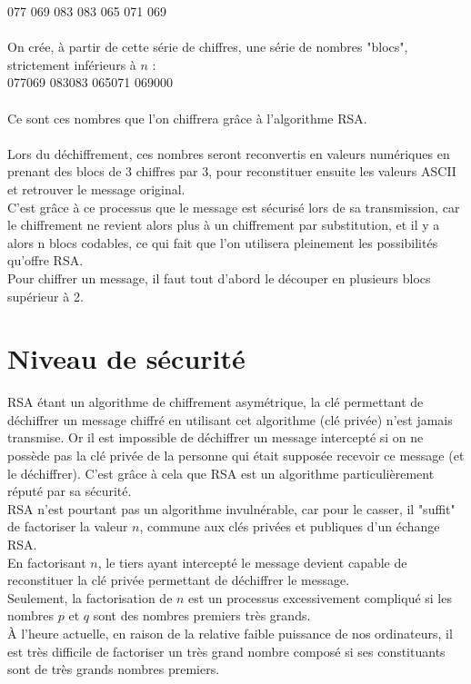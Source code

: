 		077 069 083 083 065 071 069\\
		\\
		On crée, à partir de cette série de chiffres, une série de nombres "blocs", strictement inférieurs à $n$ :\\
		077069 083083 065071 069000\\
		\\
		Ce sont ces nombres que l'on chiffrera grâce à l'algorithme RSA.\\
		\\
		Lors du déchiffrement, ces nombres seront reconvertis en valeurs numériques en prenant des blocs de 3 chiffres par 3, pour reconstituer ensuite les valeurs ASCII et retrouver le message original.\\
		C'est grâce à ce processus que le message est sécurisé lors de sa transmission, car le chiffrement ne revient alors plus à un chiffrement par substitution, et il y a alors n blocs codables, ce qui fait que l'on utilisera pleinement les possibilités qu'offre RSA.\\
		Pour chiffrer un message, il faut tout d'abord le découper en plusieurs blocs supérieur à 2.
	\section{Niveau de sécurité}
		RSA étant un algorithme de chiffrement asymétrique, la clé permettant de déchiffrer un message chiffré en utilisant cet algorithme (clé privée) n'est jamais transmise. Or il est impossible de déchiffrer un message intercepté si on ne possède pas la clé privée de la personne qui était supposée recevoir ce message (et le déchiffrer). C'est grâce à cela que RSA est un algorithme particulièrement réputé par sa sécurité.\\
		RSA n'est pourtant pas un algorithme invulnérable, car pour le casser, il "suffit" de factoriser la valeur $n$, commune aux clés privées et publiques d'un échange RSA.\\
		En factorisant $n$, le tiers ayant intercepté le message devient capable de reconstituer la clé privée permettant de déchiffrer le message.\\
		Seulement, la factorisation de $n$ est un processus excessivement compliqué si les nombres $p$ et $q$ sont des nombres premiers très grands.\\
		À l'heure actuelle, en raison de la relative faible puissance de nos ordinateurs, il est très difficile de factoriser un très grand nombre composé si ses constituants sont de très grands nombres premiers.
